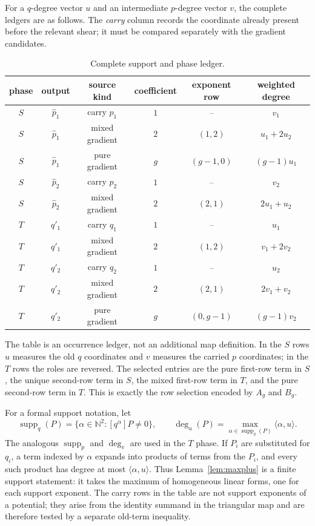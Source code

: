 \documentclass[11pt]{article}
\theoremstyle{remark}
\numberwithin{equation}{section}
\begin{document}
For a $q$-degree vector $u$ and an intermediate $p$-degree vector $v$, the
complete ledgers are as follows.  The \emph{carry} column records the coordinate
already present before the relevant shear; it must be compared separately with
the gradient candidates.
\begin{table}[t]
\centering
\small
\begin{tabular}{c|c|c|c|c|c}
\toprule
phase & output & source kind & coefficient & exponent row & weighted degree\\
\midrule
$S$ & $\widehat p_1$ & carry $p_1$ & $1$ & -- & $v_1$\\
$S$ & $\widehat p_1$ & mixed gradient & $2$ & $(1,2)$ & $u_1+2u_2$\\
$S$ & $\widehat p_1$ & pure gradient & $g$ & $(g-1,0)$ & $(g-1)u_1$\\
$S$ & $\widehat p_2$ & carry $p_2$ & $1$ & -- & $v_2$\\
$S$ & $\widehat p_2$ & mixed gradient & $2$ & $(2,1)$ & $2u_1+u_2$\\
\midrule
$T$ & $q'_1$ & carry $q_1$ & $1$ & -- & $u_1$\\
$T$ & $q'_1$ & mixed gradient & $2$ & $(1,2)$ & $v_1+2v_2$\\
$T$ & $q'_2$ & carry $q_2$ & $1$ & -- & $u_2$\\
$T$ & $q'_2$ & mixed gradient & $2$ & $(2,1)$ & $2v_1+v_2$\\
$T$ & $q'_2$ & pure gradient & $g$ & $(0,g-1)$ & $(g-1)v_2$\\
\bottomrule
\end{tabular}
\caption{Complete support and phase ledger.}\label{tab:support-ledger}
\end{table}
The table is an occurrence ledger, not an additional map definition.  In the
$S$ rows $u$ measures the old $q$ coordinates and $v$ measures the carried
$p$ coordinates; in the $T$ rows the roles are reversed.  The selected entries
are the pure first-row term in $S$, the unique second-row term in $S$, the
mixed first-row term in $T$, and the pure second-row term in $T$.  This is
exactly the row selection encoded by $A_g$ and $B_g$.

For a formal support notation, let
\[
 \operatorname{supp}_q(P)=\{\alpha\in\mathbb N^2:[q^\alpha]P\ne0\},
 \qquad
 \deg_u(P)=\max_{\alpha\in\operatorname{supp}_q(P)}
 \langle\alpha,u\rangle.
\]
The analogous $\operatorname{supp}_p$ and $\deg_v$ are used in the $T$ phase.
If $P_i$ are substituted for $q_i$, a term indexed by $\alpha$ expands into
products of terms from the $P_i$, and every such product has degree at most
$\langle\alpha,u\rangle$.  Thus Lemma~\ref{lem:maxplus} is a finite support
statement: it takes the maximum of homogeneous linear forms, one for each
support exponent.  The carry rows in the table are not support exponents of a
potential; they arise from the identity summand in the triangular map and are
therefore tested by a separate old-term inequality.
\end{document}
